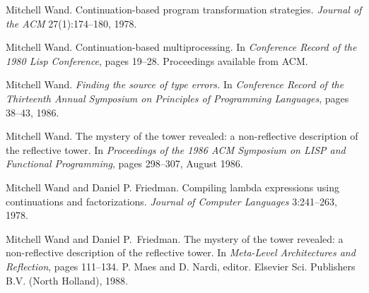 \begin{thebibliography}{999}
Mitchell Wand.
Continuation-based program transformation strategies.
{\em Journal of the ACM} 27(1):174--180, 1978.

Mitchell Wand.
Continuation-based multiprocessing.
In {\em Conference Re\-cord of the 1980 Lisp Conference}, pages 19--28.
Proceedings available from ACM.

Mitchell Wand.
{\em Finding the source of type errors.}
In {\em Conference Record of the Thirteenth Annual Symposium on
  Principles of Programming Languages}, pages 38--43, 1986.

Mitchell Wand.
The mystery of the tower revealed: a non-reflective description of the reflective tower.
In {\em Proceedings of the 1986 ACM Symposium on LISP and Functional
  Programming}, pages 298--307, August 1986.

Mitchell Wand and Daniel P. Friedman.
Compiling lambda expressions using continuations and factorizations.
{\em Journal of Computer Languages} 3:241--263, 1978.


Mitchell Wand and Daniel P.~Friedman.
The mystery of the tower revealed: a non-reflective description of the
  reflective tower.
In {\em Meta-Level Architectures and Reflection}, pages 111--134.
P. Maes and D. Nardi, editor.
Elsevier Sci. Publishers B.V. (North Holland), 1988.

\end{thebibliography}
